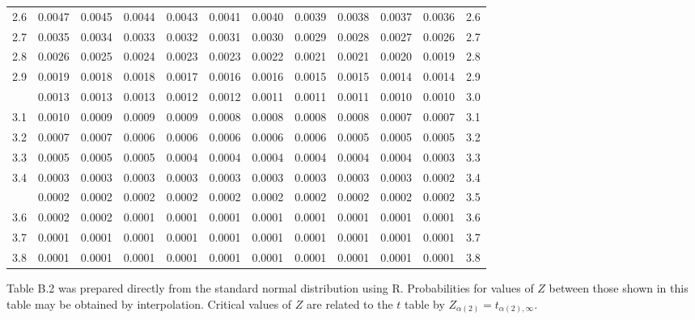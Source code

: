 \documentclass[10pt]{article}
\begin{document}
\begin{center}
\begin{longtable}{@{}r!{\vrule width 0.8pt\hspace{0.55em}}rrrrrrrrrr!{\hspace{0.55em}\vrule width 0.8pt}r@{}}
2.6 & 0.0047 & 0.0045 & 0.0044 & 0.0043 & 0.0041 & 0.0040 & 0.0039 & 0.0038 & 0.0037 & 0.0036 & 2.6 \\
2.7 & 0.0035 & 0.0034 & 0.0033 & 0.0032 & 0.0031 & 0.0030 & 0.0029 & 0.0028 & 0.0027 & 0.0026 & 2.7 \\
2.8 & 0.0026 & 0.0025 & 0.0024 & 0.0023 & 0.0023 & 0.0022 & 0.0021 & 0.0021 & 0.0020 & 0.0019 & 2.8 \\
2.9 & 0.0019 & 0.0018 & 0.0018 & 0.0017 & 0.0016 & 0.0016 & 0.0015 & 0.0015 & 0.0014 & 0.0014 & 2.9 \\
 & 0.0013 & 0.0013 & 0.0013 & 0.0012 & 0.0012 & 0.0011 & 0.0011 & 0.0011 & 0.0010 & 0.0010 & 3.0 \\
3.1 & 0.0010 & 0.0009 & 0.0009 & 0.0009 & 0.0008 & 0.0008 & 0.0008 & 0.0008 & 0.0007 & 0.0007 & 3.1 \\
3.2 & 0.0007 & 0.0007 & 0.0006 & 0.0006 & 0.0006 & 0.0006 & 0.0006 & 0.0005 & 0.0005 & 0.0005 & 3.2 \\
3.3 & 0.0005 & 0.0005 & 0.0005 & 0.0004 & 0.0004 & 0.0004 & 0.0004 & 0.0004 & 0.0004 & 0.0003 & 3.3 \\
3.4 & 0.0003 & 0.0003 & 0.0003 & 0.0003 & 0.0003 & 0.0003 & 0.0003 & 0.0003 & 0.0003 & 0.0002 & 3.4 \\
 & 0.0002 & 0.0002 & 0.0002 & 0.0002 & 0.0002 & 0.0002 & 0.0002 & 0.0002 & 0.0002 & 0.0002 & 3.5 \\
3.6 & 0.0002 & 0.0002 & 0.0001 & 0.0001 & 0.0001 & 0.0001 & 0.0001 & 0.0001 & 0.0001 & 0.0001 & 3.6 \\
3.7 & 0.0001 & 0.0001 & 0.0001 & 0.0001 & 0.0001 & 0.0001 & 0.0001 & 0.0001 & 0.0001 & 0.0001 & 3.7 \\
3.8 & 0.0001 & 0.0001 & 0.0001 & 0.0001 & 0.0001 & 0.0001 & 0.0001 & 0.0001 & 0.0001 & 0.0001 & 3.8 \\
\end{longtable}
\vspace{0.8em}
\parbox{0.97\linewidth}{\small Table B.2 was prepared directly from the standard normal distribution using R. Probabilities for values of $Z$ between those shown in this table may be obtained by interpolation. Critical values of $Z$ are related to the $t$ table by $Z_{\alpha(2)} = t_{\alpha(2),\infty}$.}
\end{center}
\end{document}
